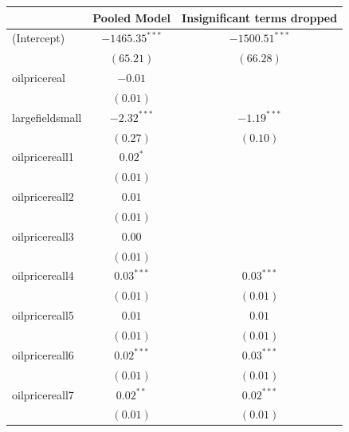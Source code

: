 \documentclass[11pt]{article}
\begin{document}
\begin{spacing}{1}
\begin{table}
\begin{center}
\begin{tabular}{l c c }
\hline
                                     & Pooled Model & Insignificant terms dropped \\
\hline
(Intercept)                          & $-1465.35^{***}$ & $-1500.51^{***}$ \\
                                     & $(65.21)$        & $(66.28)$        \\
oilpricereal                       & $-0.01$          &                  \\
                                     & $(0.01)$         &                  \\
largefieldsmall                     & $-2.32^{***}$    & $-1.19^{***}$    \\
                                     & $(0.27)$         & $(0.10)$         \\
oilpricereall1                    & $0.02^{*}$       &                  \\
                                     & $(0.01)$         &                  \\
oilpricereall2                    & $0.01$           &                  \\
                                     & $(0.01)$         &                  \\
oilpricereall3                    & $0.00$           &                  \\
                                     & $(0.01)$         &                  \\
oilpricereall4                    & $0.03^{***}$     & $0.03^{***}$     \\
                                     & $(0.01)$         & $(0.01)$         \\
oilpricereall5                    & $0.01$           & $0.01$           \\
                                     & $(0.01)$         & $(0.01)$         \\
oilpricereall6                    & $0.02^{***}$     & $0.03^{***}$     \\
                                     & $(0.01)$         & $(0.01)$         \\
oilpricereall7                    & $0.02^{**}$      & $0.02^{***}$     \\
                                     & $(0.01)$         & $(0.01)$         \\

\end{tabular}
\end{center}
\end{table}
\end{spacing}
\end{document}
